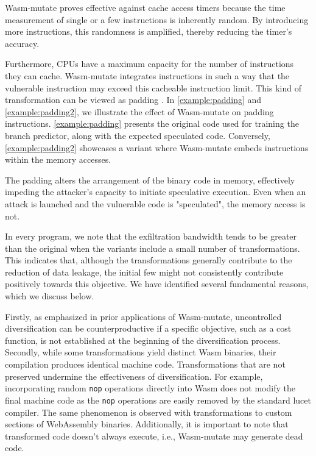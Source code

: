 \documentclass[sigplan,screen]{acmart}
\newcommand*\badge[1]{ \colorbox{red}{\color{white}#1}}
\newcommand{\tool}{Wasm-mutate\xspace}
\newcommand{\wasm}{Wasm\xspace}
\newcommand{\Wasm}{WebAssembly\xspace}
\newcommand{\todo}[1]{%
\refstepcounter{todo}
\noindent\textbf{\badge{TODO}} {\color{red}#1}
\addcontentsline{td}{todo}
{\color{red}\thesection.\thetodo\xspace #1}}
\begin{document}


\tool proves effective against cache access timers because the time measurement of single or a few instructions is inherently random. 
By introducing more instructions, this randomness is amplified, thereby reducing the timer's accuracy.

Furthermore, CPUs have a maximum capacity for the number of instructions they can cache.
\tool integrates instructions in such a way that the vulnerable instruction may exceed this cacheable instruction limit.
This kind of transformation can be viewed as padding \cite{padding}.
In \autoref{example:padding} and \autoref{example:padding2}, we illustrate the effect of \tool on padding instructions.
\autoref{example:padding} presents the original code used for training the branch predictor, along with the expected speculated code.
Conversely, \autoref{example:padding2} showcases a variant where \tool embeds instructions within the memory accesses.



The padding alters the arrangement of the binary code in memory, effectively impeding the attacker's capacity to initiate speculative execution.
Even when an attack is launched and the vulnerable code is "speculated", the memory access is not.


In every program, we note that the exfiltration bandwidth tends to be greater than the original when the variants include a small number of transformations.
This indicates that, although the transformations generally contribute to the reduction of data leakage, the initial few might not consistently contribute positively towards this objective.
We have identified several fundamental reasons, which we discuss below.

Firstly, as emphasized in prior applications of \tool \cite{CABRERAARTEAGA2023103296}, uncontrolled diversification can be counterproductive if a specific objective, such as a cost function, is not established at the beginning of the diversification process.
Secondly, while some transformations yield distinct \wasm binaries, their compilation produces identical machine code.
Transformations that are not preserved undermine the effectiveness of diversification.
For example, incorporating random \texttt{nop} operations directly into \wasm does not modify the final machine code as the \texttt{nop} operations are easily removed by the standard lucet compiler.
The same phenomenon is observed with transformations to custom sections of \Wasm binaries.
Additionally, it is important to note that transformed code doesn't always execute, i.e., \tool may generate dead code.
\end{document}
